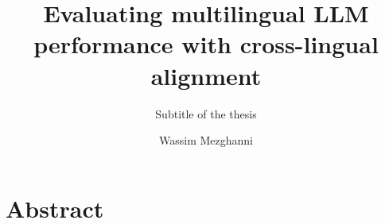 \documentclass[
  a4paper,            %
  thesis=student,     %
  english,            %
]{tumbook}
\title{Evaluating multilingual LLM performance with cross-lingual alignment}
\subtitle{Subtitle of the thesis}
\author{Wassim Mezghanni}
\begin{document}
\frontmatter
\maketitle
\chapter{Abstract}

\tableofcontents

\mainmatter






\appendix


\backmatter

\end{document}
